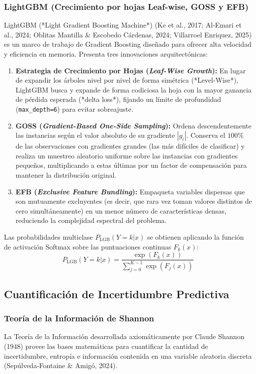 \subsubsection{LightGBM (Crecimiento por hojas Leaf-wise, GOSS y EFB)}
LightGBM (*Light Gradient Boosting Machine*) (Ke et al., 2017; Al-Emari et al., 2024; Oblitas Mantilla \& Escobedo Cárdenas, 2024; Villarroel Enriquez, 2025) es un marco de trabajo de Gradient Boosting diseñado para ofrecer alta velocidad y eficiencia en memoria. Presenta tres innovaciones arquitectónicas:
\begin{enumerate}
    \item \textbf{Estrategia de Crecimiento por Hojas (\textit{Leaf-Wise Growth}):} En lugar de expandir los árboles nivel por nivel de forma simétrica (*Level-Wise*), LightGBM busca y expande de forma codiciosa la hoja con la mayor ganancia de pérdida esperada (*delta loss*), fijando un límite de profundidad (\texttt{max\_depth=6}) para evitar sobreajuste.
    \item \textbf{GOSS (\textit{Gradient-Based One-Side Sampling}):} Ordena descendentemente las instancias según el valor absoluto de su gradiente $|g_i|$. Conserva el $100\%$ de las observaciones con gradientes grandes (las más difíciles de clasificar) y realiza un muestreo aleatorio uniforme sobre las instancias con gradientes pequeños, multiplicando a estas últimas por un factor de compensación para mantener la distribución original.
    \item \textbf{EFB (\textit{Exclusive Feature Bundling}):} Empaqueta variables dispersas que son mutuamente excluyentes (es decir, que rara vez toman valores distintos de cero simultáneamente) en un menor número de características densas, reduciendo la complejidad espectral del problema.
\end{enumerate}
Las probabilidades multiclase $P_{\mathrm{LGB}}(Y=k|x)$ se obtienen aplicando la función de activación Softmax sobre las puntuaciones continuas $F_k(x)$:
\begin{equation}
P_{\mathrm{LGB}}(Y=k|x) = \frac{\exp(F_k(x))}{\sum_{j=0}^{K-1} \exp(F_j(x))}
\end{equation}

\subsection{Cuantificación de Incertidumbre Predictiva}

\subsubsection{Teoría de la Información de Shannon}
La Teoría de la Información desarrollada axiomáticamente por Claude Shannon (1948) provee las bases matemáticas para cuantificar la cantidad de incertidumbre, entropía e información contenida en una variable aleatoria discreta (Sepúlveda-Fontaine \& Amigó, 2024).

